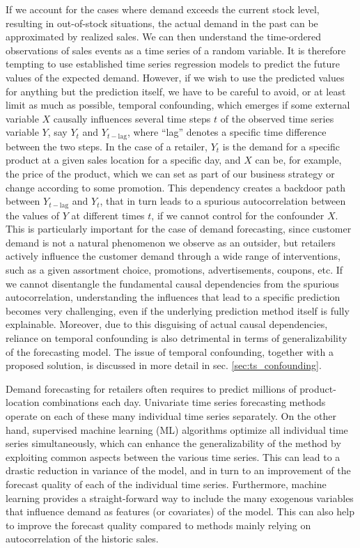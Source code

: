 \documentclass[BCOR=1mm, DIV=calc,10pt,
twoside=true,
twocolumn,
headings=normal]{scrartcl}
\begin{document}
If we account for the cases where demand exceeds the current stock level, resulting in out-of-stock situations, the actual demand in the past can be approximated by realized sales. We can then understand the time-ordered observations of sales events as a time series of a random variable. It is therefore tempting to use established time series regression models to predict the future values of the expected demand. However, if we wish to use the predicted values for anything but the prediction itself, we have to be careful to avoid, or at least limit as much as possible, temporal confounding, which emerges if some external variable $X$ causally influences several time steps $t$ of the observed time series variable $Y$, say $Y_{t}$ and $Y_{t-\mathrm{lag}}$, where ``lag'' denotes a specific time difference between the two steps. In the case of a retailer, $Y_{t}$ is the demand for a specific product at a given sales location for a specific day, and $X$ can be, for example, the price of the product, which we can set as part of our business strategy or change according to some promotion. This dependency creates a backdoor path between $Y_{t-\mathrm{lag}}$ and $Y_{t}$, that in turn leads to a spurious autocorrelation between the values of $Y$ at different times $t$, if we cannot control for the confounder $X$. This is particularly important for the case of demand forecasting, since customer demand is not a natural phenomenon we observe as an outsider, but retailers actively influence the customer demand  through a wide range of interventions, such as a given assortment choice, promotions, advertisements, coupons, etc. If we cannot disentangle the fundamental causal dependencies from the spurious autocorrelation, understanding the influences that lead to a specific prediction becomes very challenging, even if the underlying prediction method itself is fully explainable. Moreover, due to this disguising of actual causal dependencies, reliance on temporal confounding is also detrimental in terms of generalizability of the forecasting model. The issue of temporal confounding, together with a proposed solution, is discussed in more detail in sec. \ref{sec:ts_confounding}.

Demand forecasting for retailers often requires to predict millions of product-location combinations each day. Univariate time series forecasting methods operate on each of these many individual time series separately. On the other hand, supervised machine learning (ML) algorithms optimize all individual time series simultaneously, which can enhance the generalizability of the method by exploiting common aspects between the various time series. This can lead to a drastic reduction in variance of the model, and in turn to an improvement of the forecast quality of each of the individual time series. Furthermore, machine learning provides a straight-forward way to include the many exogenous variables that influence demand as features (or covariates) of the model. This can also help to improve the forecast quality compared to methods mainly relying on autocorrelation of the historic sales.
\end{document}

